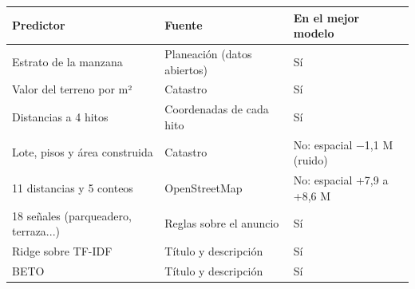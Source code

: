 \begin{tabular}{lll}
\toprule
Predictor & Fuente & En el mejor modelo \\
\midrule
Estrato de la manzana & Planeación (datos abiertos) & Sí \\
Valor del terreno por m² & Catastro & Sí \\
Distancias a 4 hitos & Coordenadas de cada hito & Sí \\
Lote, pisos y área construida & Catastro & No: espacial −1,1 M (ruido) \\
11 distancias y 5 conteos & OpenStreetMap & No: espacial +7,9 a +8,6 M \\
18 señales (parqueadero, terraza...) & Reglas sobre el anuncio & Sí \\
Ridge sobre TF-IDF & Título y descripción & Sí \\
BETO & Título y descripción & Sí \\
\bottomrule
\end{tabular}
